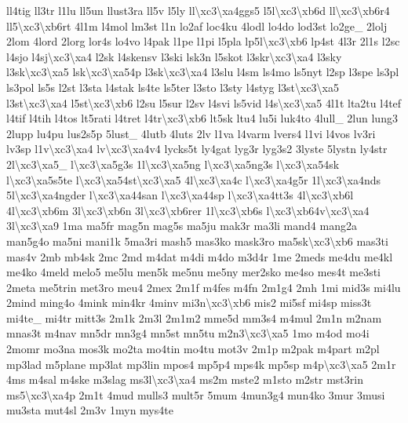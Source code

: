 {ll4tig ll3tr l1lu ll5un llust3ra ll5v l5ly ll\textbackslash{}xc3\textbackslash{}xa4ggs5 l5l\textbackslash{}xc3\textbackslash{}xb6d ll\textbackslash{}xc3\textbackslash{}xb6r4 ll5\textbackslash{}xc3\textbackslash{}xb6rt 4l1m l4mol lm3st l1n lo2af loc4ku 4lodl lo4do lod3st lo2ge\-\_\- 2lolj 2lom 4lord 2lorg lor4s lo4vo l4pak l1pe l1pi l5pla lp5l\textbackslash{}xc3\textbackslash{}xb6 lp4st 4l3r 2l1s l2sc l4sjo l4sj\textbackslash{}xc3\textbackslash{}xa4 l2sk l4skensv l3ski lsk3n l5skot l3skr\textbackslash{}xc3\textbackslash{}xa4 l3sky l3sk\textbackslash{}xc3\textbackslash{}xa5 lsk\textbackslash{}xc3\textbackslash{}xa54p l3sk\textbackslash{}xc3\textbackslash{}xa4 l3slu l4sm ls4mo ls5nyt l2sp l3spe ls3pl ls3pol ls5s l2st l3sta l4stak ls4te ls5ter l3sto l3sty l4styg l3st\textbackslash{}xc3\textbackslash{}xa5 l3st\textbackslash{}xc3\textbackslash{}xa4 l5st\textbackslash{}xc3\textbackslash{}xb6 l2su l5sur l2sv l4svi ls5vid l4s\textbackslash{}xc3\textbackslash{}xa5 4l1t lta2tu l4tef l4tif l4tih l4tos lt5rati l4tret l4tr\textbackslash{}xc3\textbackslash{}xb6 lt5sk ltu4 lu5i luk4to 4lull\-\_\- 2lun lung3 2lupp lu4pu lus2s5p 5lust\-\_\- 4lutb 4luts 2lv l1va l4varm lvers4 l1vi l4vos lv3ri lv3sp l1v\textbackslash{}xc3\textbackslash{}xa4 lv\textbackslash{}xc3\textbackslash{}xa4v4 lycks5t ly4gat lyg3r lyg3s2 3lyste 5lystn ly4str 2l\textbackslash{}xc3\textbackslash{}xa5\-\_\- l\textbackslash{}xc3\textbackslash{}xa5g3s 1l\textbackslash{}xc3\textbackslash{}xa5ng l\textbackslash{}xc3\textbackslash{}xa5ng3s l\textbackslash{}xc3\textbackslash{}xa54sk l\textbackslash{}xc3\textbackslash{}xa5s5te l\textbackslash{}xc3\textbackslash{}xa54st\textbackslash{}xc3\textbackslash{}xa5 4l\textbackslash{}xc3\textbackslash{}xa4c l\textbackslash{}xc3\textbackslash{}xa4g5r 1l\textbackslash{}xc3\textbackslash{}xa4nds 5l\textbackslash{}xc3\textbackslash{}xa4ngder l\textbackslash{}xc3\textbackslash{}xa44san l\textbackslash{}xc3\textbackslash{}xa44sp l\textbackslash{}xc3\textbackslash{}xa4tt3s 4l\textbackslash{}xc3\textbackslash{}xb6l 4l\textbackslash{}xc3\textbackslash{}xb6m 3l\textbackslash{}xc3\textbackslash{}xb6n 3l\textbackslash{}xc3\textbackslash{}xb6rer 1l\textbackslash{}xc3\textbackslash{}xb6s l\textbackslash{}xc3\textbackslash{}xb64v\textbackslash{}xc3\textbackslash{}xa4 3l\textbackslash{}xc3\textbackslash{}xa9 1ma ma5fr mag5n mag5s ma5ju mak3r ma3li mand4 mang2a man5g4o ma5ni mani1k 5ma3ri mash5 mas3ko mask3ro ma5sk\textbackslash{}xc3\textbackslash{}xb6 mas3ti mas4v 2mb mb4sk 2mc 2md m4dat m4di m4do m3d4r 1me 2meds me4du me4kl me4ko 4meld melo5 me5lu men5k me5nu me5ny mer2sko me4so mes4t me3sti 2meta me5trin met3ro meu4 2mex 2m1f m4fes m4fn 2m1g4 2mh 1mi mid3s mi4lu 2mind ming4o 4mink min4kr 4minv mi3n\textbackslash{}xc3\textbackslash{}xb6 mis2 mi5sf mi4sp miss3t mi4te\-\_\- mi4tr mitt3s 2m1k 2m3l 2m1m2 mme5d mm3s4 m4mul 2m1n m2nam mnas3t m4nav mn5dr mn3g4 mn5st mn5tu m2n3\textbackslash{}xc3\textbackslash{}xa5 1mo m4od mo4i 2momr mo3na mos3k mo2ta mo4tin mo4tu mot3v 2m1p m2pak m4part m2pl mp3lad m5plane mp3lat mp3lin mpos4 mp5p4 mps4k mp5sp m4p\textbackslash{}xc3\textbackslash{}xa5 2m1r 4ms m4sal m4ske m3slag ms3l\textbackslash{}xc3\textbackslash{}xa4 ms2m mste2 m1sto m2str mst3rin ms5\textbackslash{}xc3\textbackslash{}xa4p 2m1t 4mud mulls3 mult5r 5mum 4mun3g4 mun4ko 3mur 3musi mu3sta mut4sl 2m3v 1myn mys4te }
